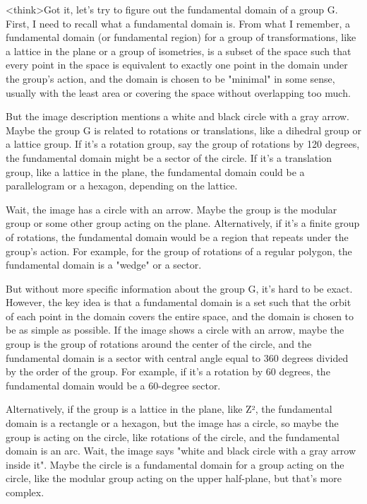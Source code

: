 <think>Got it, let's try to figure out the fundamental domain of a group G. First, I need to recall what a fundamental domain is. From what I remember, a fundamental domain (or fundamental region) for a group of transformations, like a lattice in the plane or a group of isometries, is a subset of the space such that every point in the space is equivalent to exactly one point in the domain under the group's action, and the domain is chosen to be "minimal" in some sense, usually with the least area or covering the space without overlapping too much.

But the image description mentions a white and black circle with a gray arrow. Maybe the group G is related to rotations or translations, like a dihedral group or a lattice group. If it's a rotation group, say the group of rotations by 120 degrees, the fundamental domain might be a sector of the circle. If it's a translation group, like a lattice in the plane, the fundamental domain could be a parallelogram or a hexagon, depending on the lattice.

Wait, the image has a circle with an arrow. Maybe the group is the modular group or some other group acting on the plane. Alternatively, if it's a finite group of rotations, the fundamental domain would be a region that repeats under the group's action. For example, for the group of rotations of a regular polygon, the fundamental domain is a "wedge" or a sector.

But without more specific information about the group G, it's hard to be exact. However, the key idea is that a fundamental domain is a set such that the orbit of each point in the domain covers the entire space, and the domain is chosen to be as simple as possible. If the image shows a circle with an arrow, maybe the group is the group of rotations around the center of the circle, and the fundamental domain is a sector with central angle equal to 360 degrees divided by the order of the group. For example, if it's a rotation by 60 degrees, the fundamental domain would be a 60-degree sector.

Alternatively, if the group is a lattice in the plane, like Z², the fundamental domain is a rectangle or a hexagon, but the image has a circle, so maybe the group is acting on the circle, like rotations of the circle, and the fundamental domain is an arc. Wait, the image says "white and black circle with a gray arrow inside it". Maybe the circle is a fundamental domain for a group acting on the circle, like the modular group acting on the upper half-plane, but that's more complex.


